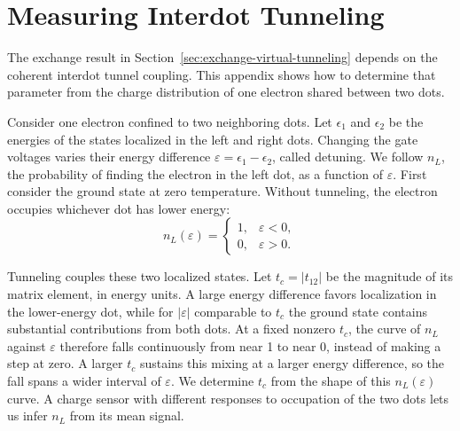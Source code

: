 \FloatBarrier
\section{Measuring Interdot Tunneling}
\label{app:tunnel-coupling}
\label{sec:measurement-tunnel-spectroscopy}

The exchange result in Section~\ref{sec:exchange-virtual-tunneling}
depends on the coherent interdot tunnel coupling. This appendix shows
how to determine that parameter from the charge distribution of one
electron shared between two dots.

Consider one electron confined to two neighboring dots. Let
$\epsilon_1$ and $\epsilon_2$ be the energies of the states
localized in the left and right dots. Changing the gate voltages
varies their energy difference $\varepsilon=\epsilon_1-\epsilon_2$,
called detuning. We follow $n_L$, the probability of finding
the electron in the left dot, as a function of $\varepsilon$.
First consider the ground state at zero temperature. Without
tunneling, the electron occupies whichever dot has lower energy:
\[
 n_L(\varepsilon)=
 \begin{cases}
  1,&\varepsilon<0,\\
  0,&\varepsilon>0.
 \end{cases}
\]

Tunneling couples these two localized states. Let
$t_c=|t_{12}|$ be the magnitude of its matrix element, in energy
units. A large energy difference favors localization in the
lower-energy dot, while for $|\varepsilon|$ comparable to $t_c$
the ground state contains substantial contributions from both
dots. At a fixed nonzero $t_c$, the curve of $n_L$ against
$\varepsilon$ therefore falls continuously from near 1 to near 0,
instead of making a step at zero. A larger $t_c$ sustains this
mixing at a larger energy difference, so the fall spans a wider
interval of $\varepsilon$. We determine $t_c$ from the shape
of this $n_L(\varepsilon)$ curve. A charge sensor with different
responses to occupation of the two dots lets us infer $n_L$
from its mean signal.

